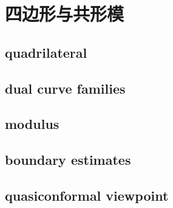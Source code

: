 \section{四边形与共形模}
\label{b3:sec:0804}


\subsection{quadrilateral}
\label{b3:subsec:080401}

\subsection{dual curve families}
\label{b3:subsec:080402}

\subsection{modulus}
\label{b3:subsec:080403}

\subsection{boundary estimates}
\label{b3:subsec:080404}

\subsection{quasiconformal viewpoint}
\label{b3:subsec:080405}


